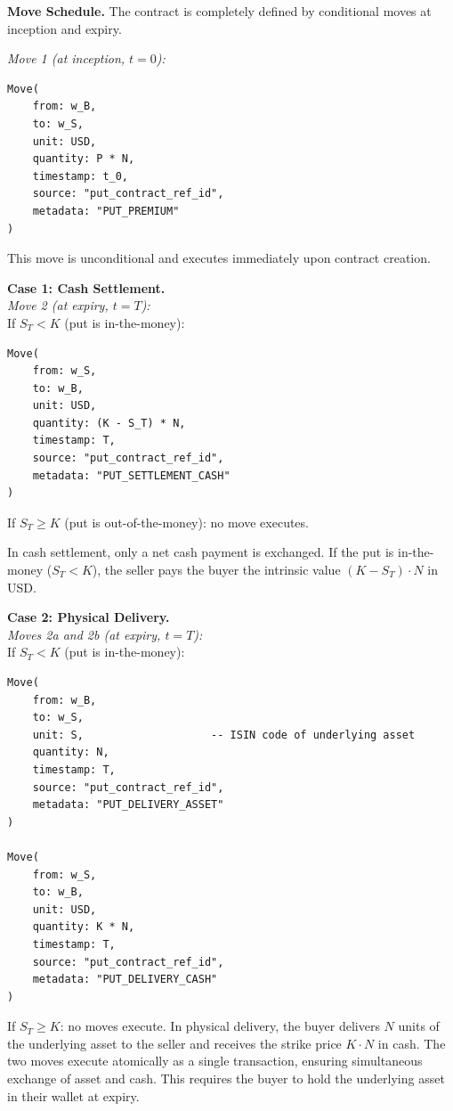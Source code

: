 \documentclass[11pt,a4paper]{article}
\begin{document}
\noindent\textbf{Move Schedule.}
The contract is completely defined by conditional moves at inception and expiry.

\noindent\textit{Move 1 (at inception, $t = 0$):}

\begin{lstlisting}
Move(
    from: w_B,
    to: w_S,
    unit: USD,
    quantity: P * N,
    timestamp: t_0,
    source: "put_contract_ref_id",
    metadata: "PUT_PREMIUM"
)
\end{lstlisting}

This move is unconditional and executes immediately upon contract creation.

\noindent\textbf{Case 1: Cash Settlement.}\\
\textit{Move 2 (at expiry, $t = T$):}\\
If $S_T < K$ (put is in-the-money):

\begin{lstlisting}
Move(
    from: w_S,
    to: w_B,
    unit: USD,
    quantity: (K - S_T) * N,
    timestamp: T,
    source: "put_contract_ref_id",
    metadata: "PUT_SETTLEMENT_CASH"
)
\end{lstlisting}

If $S_T \geq K$ (put is out-of-the-money): no move executes.

In cash settlement, only a net cash payment is exchanged. If the put is in-the-money ($S_T < K$), the seller pays the buyer the intrinsic value $(K - S_T) \cdot N$ in USD.

\noindent\textbf{Case 2: Physical Delivery.}\\
\textit{Moves 2a and 2b (at expiry, $t = T$):}\\
If $S_T < K$ (put is in-the-money):

\begin{lstlisting}
Move(
    from: w_B,
    to: w_S,
    unit: S,                    -- ISIN code of underlying asset
    quantity: N,
    timestamp: T,
    source: "put_contract_ref_id",
    metadata: "PUT_DELIVERY_ASSET"
)

Move(
    from: w_S,
    to: w_B,
    unit: USD,
    quantity: K * N,
    timestamp: T,
    source: "put_contract_ref_id",
    metadata: "PUT_DELIVERY_CASH"
)
\end{lstlisting}

If $S_T \geq K$: no moves execute. In physical delivery, the buyer delivers $N$ units of the underlying asset to the seller and receives the strike price $K \cdot N$ in cash. The two moves execute atomically as a single transaction, ensuring simultaneous exchange of asset and cash. This requires the buyer to hold the underlying asset in their wallet at expiry.
\end{document}
